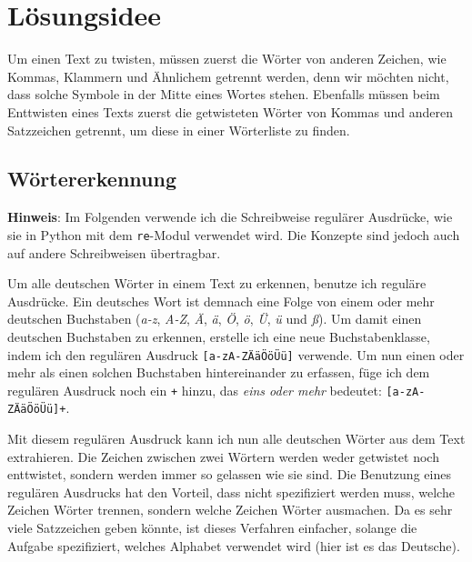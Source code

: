 \documentclass[a4paper,10pt,ngerman]{scrartcl}
\title{\Aufgabe}
\author{\Name\\Team-ID: \TeamId}
\date{\today}
\begin{document}
\maketitle
\tableofcontents

\clearpage

\section{Lösungsidee}
Um einen Text zu twisten, müssen zuerst die Wörter von anderen Zeichen, wie Kommas, Klammern und Ähnlichem getrennt werden, denn wir möchten nicht, dass solche Symbole in der Mitte eines Wortes stehen. Ebenfalls müssen beim Enttwisten eines Texts zuerst die getwisteten Wörter von Kommas und anderen Satzzeichen getrennt, um diese in einer Wörterliste zu finden.

\subsection{Wörtererkennung}
\textbf{Hinweis}: Im Folgenden verwende ich die Schreibweise regulärer Ausdrücke, wie sie in Python mit dem \texttt{re}-Modul verwendet wird. Die Konzepte sind jedoch auch auf andere Schreibweisen übertragbar.
\vspace{10pt}

Um alle deutschen Wörter in einem Text zu erkennen, benutze ich reguläre Ausdrücke. Ein deutsches Wort ist demnach eine Folge von einem oder mehr deutschen Buchstaben (\textit{a-z}, \textit{A-Z}, \textit{Ä}, \textit{ä}, \textit{Ö}, \textit{ö}, \textit{Ü}, \textit{ü} und \textit{ß}). Um damit einen deutschen Buchstaben zu erkennen, erstelle ich eine neue Buchstabenklasse, indem ich den regulären Ausdruck \texttt{[a-zA-ZÄäÖöÜü]} verwende. Um nun einen oder mehr als einen solchen Buchstaben hintereinander zu erfassen, füge ich dem regulären Ausdruck noch ein \texttt{+} hinzu, das \textit{eins oder mehr} bedeutet: \texttt{[a-zA-ZÄäÖöÜü]+}.

Mit diesem regulären Ausdruck kann ich nun alle deutschen Wörter aus dem Text extrahieren. Die Zeichen zwischen zwei Wörtern werden weder getwistet noch enttwistet, sondern werden immer so gelassen wie sie sind. Die Benutzung eines regulären Ausdrucks hat den Vorteil, dass nicht spezifiziert werden muss, welche Zeichen Wörter trennen, sondern welche Zeichen Wörter ausmachen. Da es sehr viele Satzzeichen geben könnte, ist dieses Verfahren einfacher, solange die Aufgabe spezifiziert, welches Alphabet verwendet wird (hier ist es das Deutsche).
\end{document}
